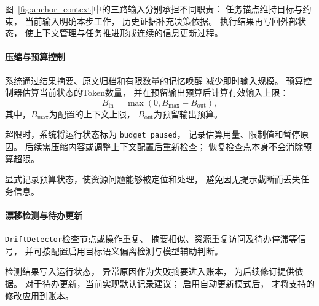 图~\ref{fig:anchor_context}中的三路输入分别承担不同职责：
任务锚点维持目标与约束，
当前输入明确本步工作，
历史证据补充决策依据。
执行结果再写回外部状态，
使上下文管理与任务推进形成连续的信息更新过程。






\paragraph{压缩与预算控制}

系统通过结果摘要、原文归档和有限数量的记忆唤醒
减少即时输入规模。
预算控制器估算当前状态的Token数量，
并在预留输出预算后计算有效输入上限：
\begin{equation}
    B_{\mathrm{in}}
    =
    \max\left(0,B_{\mathrm{max}}-B_{\mathrm{out}}\right),
    \label{eq:anchor_budget}
\end{equation}
其中，$B_{\mathrm{max}}$为配置的上下文上限，
$B_{\mathrm{out}}$为预留输出预算。

超限时，系统将运行状态标为
\texttt{budget\_paused}，
记录估算用量、限制值和暂停原因。
后续需压缩内容或调整上下文配置后重新检查；
恢复检查点本身不会消除预算超限。

显式记录预算状态，使资源问题能够被定位和处理，
避免因无提示截断而丢失任务信息。


\paragraph{漂移检测与待办更新}

\texttt{DriftDetector}检查节点或操作重复、
摘要相似、资源重复访问及待办停滞等信号，
并可按配置启用目标语义偏离检测与模型辅助判断。

检测结果写入运行状态，
异常原因作为失败摘要进入账本，
为后续修订提供依据。
对于待办更新，当前实现默认记录建议；
启用自动更新模式后，
才将支持的修改应用到账本。

